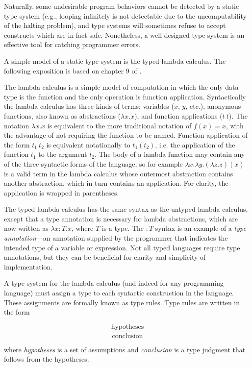 \documentclass{article}
\begin{document}
Naturally, some undesirable program behaviors cannot be detected by a static type system (e.g., looping infinitely is not detectable due to the uncomputability of the halting problem), and type systems will sometimes refuse to accept constructs which are in fact safe. Nonetheless, a well-designed type system is an effective tool for catching programmer errors.

A simple model of a static type system is the typed lambda-calculus. The following exposition is based on chapter 9 of \cite{types}.

The lambda calculus is a simple model of computation in which the only data type is the function and the only operation is function application. Syntactically the lambda calculus has three kinds of terms: variables ($x$, $y$, etc.), anonymous functions, also known as abstractions ($\lambda x . x$), and function applications ($t\ t$). The notation $\lambda x . x$ is equivalent to the more traditional notation of $f(x) = x$, with the advantage of not requiring the function to be named. Function application of the form $t_1\ t_2$ is equivalent notationally to $t_1(t_2)$, i.e. the application of the function $t_1$ to the argument $t_2$. The body of a lambda function may contain any of the three syntactic forms of the language, so for example $\lambda x . \lambda y . (\lambda z . z)(x)$ is a valid term in the lambda calculus whose outermost abstraction contains another abstraction, which in turn contains an application. For clarity, the application is wrapped in parentheses.

The typed lambda calculus has the same syntax as the untyped lambda calculus, except that a type annotation is necessary for lambda abstractions, which are now written as $\lambda x: T . x$, where $T$ is a type. The $: T$ syntax is an example of a \textit{type annotation}---an annotation supplied by the programmer that indicates the intended type of a variable or expression. Not all typed languages require type annotations, but they can be beneficial for clarity and simplicity of implementation.

A type system for the lambda calculus (and indeed for any programming language) must assign a type to each syntactic construction in the language. These assignments are formally known as type rules. Type rules are written in the form

\[
\frac{\text{hypotheses}}
{\text{conclusion}}
\]

\noindent where \textit{hypotheses} is a set of assumptions and \textit{conclusion} is a type judgment that follows from the hypotheses.
\end{document}
